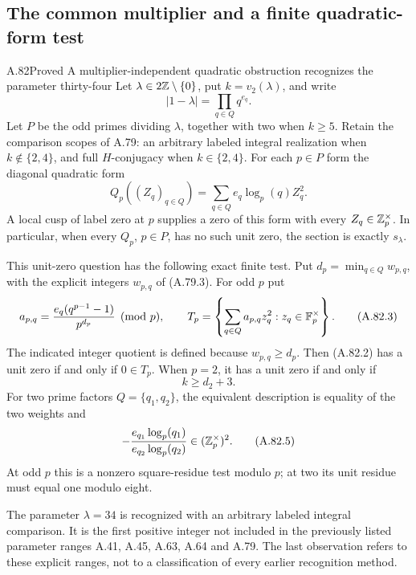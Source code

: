 \subsection{The common multiplier and a finite quadratic-form test}

\begin{statement}{A.82}{Proved}
{A multiplier-independent quadratic obstruction recognizes the parameter thirty-four}
Let $\lambda\in2\mathbb Z\setminus\{0\}$, put $k=v_2(\lambda)$,
and write
\[
                  |1-\lambda|=\prod_{q\in Q}q^{e_q}.
\tag{A.82.1}
\]
Let $P$ be the odd primes dividing $\lambda$, together
with two when $k\ge5$.  Retain the comparison scopes of
A.79: an arbitrary labeled integral realization when
$k\notin\{2,4\}$, and full $H$-conjugacy when
$k\in\{2,4\}$.
For each $p\in P$ form the diagonal quadratic form
\[
             Q_p((Z_q)_{q\in Q})
                         =\sum_{q\in Q}e_q\log_p(q)Z_q^2.
\tag{A.82.2}
\]
A local cusp of label zero at $p$ supplies a zero of this
form with every $Z_q\in\mathbb Z_p^\times$.
In particular, when every $Q_p$, $p\in P$, has no such unit zero,
the section is exactly $s_\lambda$.

This unit-zero question has the following exact finite test.
Put $d_p=\min_{q\in Q}w_{p,q}$, with the explicit integers
$w_{p,q}$ of (A.79.3).
For odd $p$ put
\[
 a_{p,q}=\frac{e_q(q^{p-1}-1)}{p^{d_p}}\pmod p,
 \qquad
 T_p=\left\{\sum_{q\in Q}a_{p,q}z_q^2:
                                      z_q\in\mathbb F_p^\times\right\}.
\tag{A.82.3}
\]
The indicated integer quotient is defined because
$w_{p,q}\ge d_p$.
Then (A.82.2) has a unit zero if and only if $0\in T_p$.
When $p=2$, it has a unit zero if and only if
\[
                                  k\ge d_2+3.
\tag{A.82.4}
\]
For two prime factors $Q=\{q_1,q_2\}$, the equivalent
description is equality of the two weights and
\[
             -\frac{e_{q_1}\log_p(q_1)}
                      {e_{q_2}\log_p(q_2)}
                            \in(\mathbb Z_p^\times)^2.
\tag{A.82.5}
\]
At odd $p$ this is a nonzero square-residue test modulo $p$;
at two its unit residue must equal one modulo eight.

The parameter $\lambda=34$ is recognized with an arbitrary
labeled integral comparison.  It is the first positive
integer not included in the previously listed parameter
ranges A.41, A.45, A.63, A.64 and A.79.
The last observation refers to these explicit ranges,
not to a classification of every earlier recognition method.
\end{statement}
